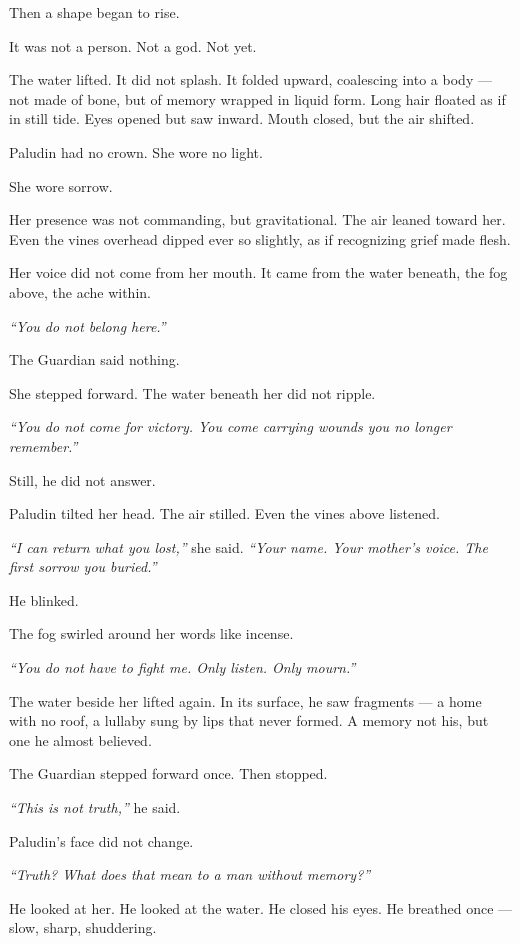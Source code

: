 \documentclass[9pt]{article}
\begin{document}
Then a shape began to rise.

It was not a person. Not a god. Not yet.

The water lifted. It did not splash. It folded upward, coalescing into a body — not made of bone, but of memory wrapped in liquid form. Long hair floated as if in still tide. Eyes opened but saw inward. Mouth closed, but the air shifted.

Paludin had no crown. She wore no light.

She wore sorrow.

Her presence was not commanding, but gravitational. The air leaned toward her. Even the vines overhead dipped ever so slightly, as if recognizing grief made flesh.

Her voice did not come from her mouth. It came from the water beneath, the fog above, the ache within.

\textit{``You do not belong here.''}

The Guardian said nothing.

She stepped forward. The water beneath her did not ripple.

\textit{``You do not come for victory. You come carrying wounds you no longer remember.''}

Still, he did not answer.

Paludin tilted her head. The air stilled. Even the vines above listened.

\textit{``I can return what you lost,''} she said. \textit{``Your name. Your mother’s voice. The first sorrow you buried.''}

He blinked.

The fog swirled around her words like incense.

\textit{``You do not have to fight me. Only listen. Only mourn.''}

The water beside her lifted again. In its surface, he saw fragments — a home with no roof, a lullaby sung by lips that never formed. A memory not his, but one he almost believed.

The Guardian stepped forward once. Then stopped.

\textit{``This is not truth,''} he said.

Paludin’s face did not change.

\textit{``Truth? What does that mean to a man without memory?''}

He looked at her. He looked at the water. He closed his eyes. He breathed once — slow, sharp, shuddering.
\end{document}
